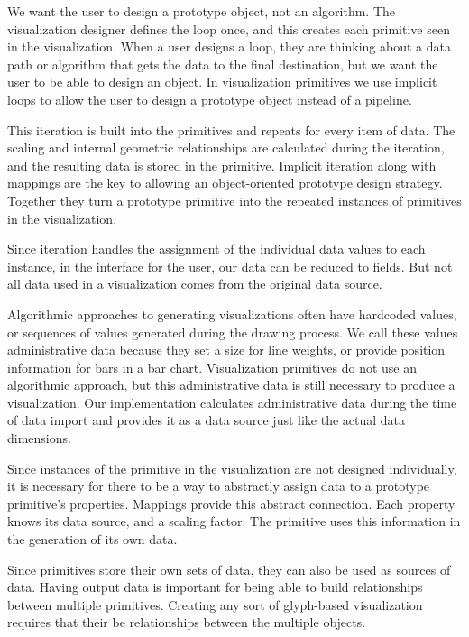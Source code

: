 We want the user to design a prototype object, not an algorithm.
The visualization designer defines the loop once, and this creates each primitive seen in the visualization.
When a user designs a loop, they are thinking about a data path or algorithm that gets the data to the final destination, but we want the user to be able to design an object.
In visualization primitives we use implicit loops to allow the user to design a prototype object instead of a pipeline.

This iteration is built into the primitives and repeats for every item of data.
The scaling and internal geometric relationships are calculated during the iteration, and the resulting data is stored in the primitive.
Implicit iteration along with mappings are the key to allowing an object-oriented prototype design strategy.
Together they turn a prototype primitive into the repeated instances of primitives in the visualization.

\label{data}

Since iteration handles the assignment of the individual data values to each instance, in the interface for the user, our data can be reduced to fields.
But not all data used in a visualization comes from the original data source.

Algorithmic approaches to generating visualizations often have hardcoded values, or sequences of values generated during the drawing process.
We call these values administrative data because they set a size for line weights, or provide position information for bars in a bar chart.
Visualization primitives do not use an algorithmic approach, but this administrative data is still necessary to produce a visualization.
Our implementation calculates administrative data during the time of data import and provides it as a data source just like the actual data dimensions.

\label{mappings}

Since instances of the primitive in the visualization are not designed individually, it is necessary for there to be a way to abstractly assign data to a prototype primitive's properties.
Mappings provide this abstract connection.
Each property knows its data source, and a scaling factor.
The primitive uses this information in the generation of its own data.

\label{connections}

Since primitives store their own sets of data, they can also be used as sources of data.
Having output data is important for being able to build relationships between multiple primitives.
Creating any sort of glyph-based visualization requires that their be relationships between the multiple objects.


